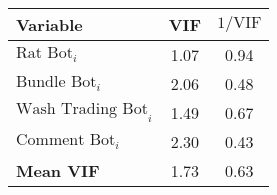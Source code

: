 \begin{tabular}{lcc}
\hline
Variable & VIF & $1/\text{VIF}$ \\
\hline
$\text{Rat Bot}_{i}$ & 1.07 & 0.94 \\
$\text{Bundle Bot}_{i}$ & 2.06 & 0.48 \\
$\text{Wash Trading Bot}_{i}$ & 1.49 & 0.67 \\
$\text{Comment Bot}_{i}$ & 2.30 & 0.43 \\
\hline
\textbf{Mean VIF} & 1.73 & 0.63 \\
\hline
\end{tabular}